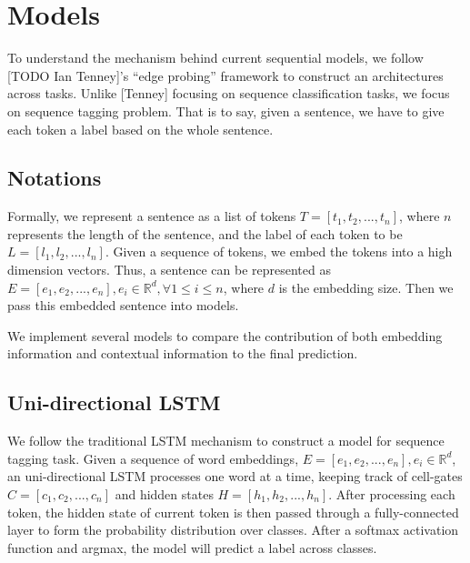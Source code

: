 \documentclass{article}
\newcommand{\red}[1]{\textcolor{red}{#1}}
\begin{document}

\section{Models}

To understand the mechanism behind current sequential models, we follow [TODO Ian Tenney]'s ``edge probing'' framework to construct an architectures across tasks. Unlike [Tenney] focusing on sequence classification tasks, we focus on sequence tagging problem. That is to say, given a sentence, we have to give each token a label based on the whole sentence.

\subsection{Notations}
Formally, we represent a sentence as a list of tokens $T = [t_1, t_2, ... , t_n]$, where $n$ represents the length of the sentence, and the label of each token to be $L = [l_1, l_2, ... , l_n]$. Given a sequence of tokens, we embed the tokens into a high dimension vectors. Thus, a sentence can be represented as $E = [e_1, e_2, ... , e_n], e_i \in \mathbb{R}^d, \forall 1 \leq i \leq n$, where $d$ is the embedding size. Then we pass this embedded sentence into models.


We implement several models to compare the contribution of both embedding information and contextual information to the final prediction. 

\subsection{Uni-directional LSTM}

We follow the traditional LSTM mechanism to construct a model for sequence tagging task. Given a sequence of word embeddings, $E = [e_1, e_2, ... , e_n], e_i \in \mathbb{R}^d$, an uni-directional LSTM processes one word at a time, keeping track of cell-gates $C = [c_1, c_2, ... , c_n]$ and hidden states $H = [h_1, h_2, ... , h_n]$. After processing each token, the hidden state of current token is then passed through a fully-connected layer to form the probability distribution over classes. After a softmax activation function and argmax, the model will predict a label across classes.
\end{document}
